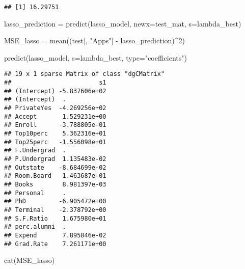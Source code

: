 \documentclass[
]{article}
\newenvironment{Shaded}{\begin{snugshade}}{\end{snugshade}}
\newcommand{\AttributeTok}[1]{\textcolor[rgb]{0.77,0.63,0.00}{#1}}
\newcommand{\DecValTok}[1]{\textcolor[rgb]{0.00,0.00,0.81}{#1}}
\newcommand{\FunctionTok}[1]{\textcolor[rgb]{0.00,0.00,0.00}{#1}}
\newcommand{\NormalTok}[1]{#1}
\newcommand{\OtherTok}[1]{\textcolor[rgb]{0.56,0.35,0.01}{#1}}
\newcommand{\SpecialCharTok}[1]{\textcolor[rgb]{0.00,0.00,0.00}{#1}}
\newcommand{\StringTok}[1]{\textcolor[rgb]{0.31,0.60,0.02}{#1}}
\begin{document}
\begin{Shaded}
\end{Shaded}

\begin{verbatim}
## [1] 16.29751
\end{verbatim}

\begin{Shaded}
\begin{Highlighting}[]
\NormalTok{lasso\_prediction }\OtherTok{=} \FunctionTok{predict}\NormalTok{(lasso\_model, }\AttributeTok{newx=}\NormalTok{test\_mat, }\AttributeTok{s=}\NormalTok{lambda\_best)}

\NormalTok{MSE\_lasso }\OtherTok{=} \FunctionTok{mean}\NormalTok{((test[, }\StringTok{"Apps"}\NormalTok{] }\SpecialCharTok{{-}}\NormalTok{ lasso\_prediction)}\SpecialCharTok{\^{}}\DecValTok{2}\NormalTok{)}

\FunctionTok{predict}\NormalTok{(lasso\_model, }\AttributeTok{s=}\NormalTok{lambda\_best, }\AttributeTok{type=}\StringTok{"coefficients"}\NormalTok{)}
\end{Highlighting}
\end{Shaded}

\begin{verbatim}
## 19 x 1 sparse Matrix of class "dgCMatrix"
##                        s1
## (Intercept) -5.837606e+02
## (Intercept)  .           
## PrivateYes  -4.269256e+02
## Accept       1.529231e+00
## Enroll      -3.788805e-01
## Top10perc    5.362316e+01
## Top25perc   -1.556098e+01
## F.Undergrad  .           
## P.Undergrad  1.135483e-02
## Outstate    -8.684699e-02
## Room.Board   1.463687e-01
## Books        8.981397e-03
## Personal     .           
## PhD         -6.905472e+00
## Terminal    -2.378792e+00
## S.F.Ratio    1.675980e+01
## perc.alumni  .           
## Expend       7.895846e-02
## Grad.Rate    7.261171e+00
\end{verbatim}

\begin{Shaded}
\begin{Highlighting}[]
\FunctionTok{cat}\NormalTok{(MSE\_lasso)}
\end{Highlighting}
\end{Shaded}
\end{document}
